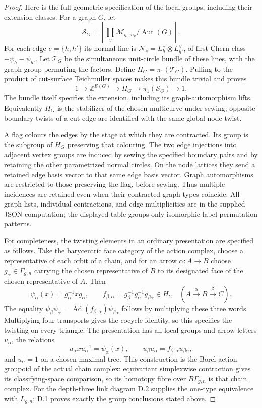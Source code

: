 \begin{proof}
Here is the full geometric specification of the local groups, including their extension classes. For a graph $G$, let
\[
 \mathcal S_G=\left[\prod_v\mathcal M_{g_v,n_v}/\operatorname{Aut}(G)\right].
\]
For each edge $e=\{h,h'\}$ its normal line is
$\mathcal N_e=L_h^\vee\otimes L_{h'}^\vee$, of first Chern class
$-\psi_h-\psi_{h'}$. Let $\mathcal T_G$ be the simultaneous unit-circle bundle of these lines, with the graph group permuting the factors. Define $H_G=\pi_1(\mathcal T_G)$. Pulling to the product of cut-surface Teichm\"uller spaces makes this bundle trivial and proves
\[
 1\longrightarrow\mathbb Z^{E(G)}
 \longrightarrow H_G
 \longrightarrow\pi_1(\mathcal S_G)\longrightarrow1.
\]
The bundle itself specifies the extension, including its graph-automorphism lifts. Equivalently $H_G$ is the stabilizer of the chosen multicurve under sewing; opposite boundary twists of a cut edge are identified with the same global node twist.

A flag colours the edges by the stage at which they are contracted. Its group is the subgroup of $H_G$ preserving that colouring. The two edge injections into adjacent vertex groups are induced by sewing the specified boundary pairs and by retaining the other parametrized normal circles. On the node lattices they send a retained edge basis vector to that same edge basis vector. Graph automorphisms are restricted to those preserving the flag, before sewing. Thus multiple incidences are retained even when their contracted graph types coincide. All graph lists, individual contractions, and edge multiplicities are in the supplied JSON computation; the displayed table groups only isomorphic label-permutation patterns.

For completeness, the twisting elements in an ordinary presentation are specified as follows. Take the barycentric face category of the action complex, choose a representative of each orbit of a chain, and for an arrow $\alpha:A\to B$ choose $g_\alpha\in\Gamma_{g,n}$ carrying the chosen representative of $B$ to its designated face of the chosen representative of $A$. Then
\[
 \psi_\alpha(x)=g_\alpha^{-1}xg_\alpha,\qquad
 f_{\beta,\alpha}=g_\beta^{-1}g_\alpha^{-1}g_{\beta\alpha}
 \in H_C\quad(A\xrightarrow{\alpha}B\xrightarrow{\beta}C).
\]
The equality $\psi_\beta\psi_\alpha=\operatorname{Ad}(f_{\beta,\alpha})\psi_{\beta\alpha}$ follows by multiplying these three words. Multiplying four transports gives the cocycle identity, so this specifies the twisting on every triangle. The presentation has all local groups and arrow letters $u_\alpha$, the relations
\[
 u_\alpha x u_\alpha^{-1}=\psi_\alpha(x),\qquad
 u_\beta u_\alpha=f_{\beta,\alpha}u_{\beta\alpha},
\]
and $u_\alpha=1$ on a chosen maximal tree. This construction is the Borel action groupoid of the actual chain complex: equivariant simplexwise contraction gives its classifying-space comparison, so its homotopy fibre over $B\Gamma_{g,n}$ is that chain complex. For the depth-three link diagram D.2 supplies the one-type equivalence with $L_{g,n}$; D.1 proves exactly the group conclusions stated above.


\end{proof}
